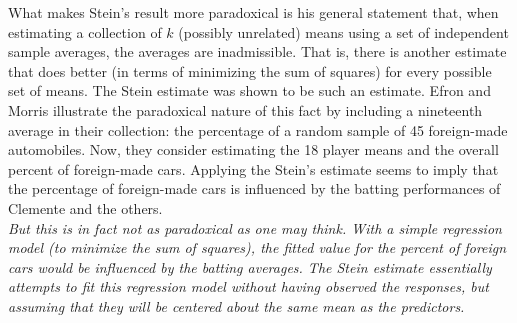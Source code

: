 \begin{enumerate}[a)]
    What makes Stein's result more paradoxical is his general statement that,
when estimating a collection of $k$ (possibly unrelated) means using a set of independent sample averages, the averages
are inadmissible. That is, there is another estimate that does better (in terms of minimizing the sum of squares) for every possible set of means. The Stein estimate
was shown to be such an estimate. Efron and Morris illustrate the paradoxical nature of this fact by including a nineteenth average in their collection: the
percentage of a random sample of 45 foreign-made automobiles. Now, they
consider estimating the 18 player means and the overall percent of foreign-made
cars. Applying the Stein's estimate seems to imply that the percentage of foreign-made cars is influenced by the batting performances of Clemente and
the others. \\

\textit{But this is in fact not as paradoxical as one may think. With a simple regression model (to minimize the sum of squares),
the fitted value for the percent of foreign cars would be influenced by the batting
averages. The Stein estimate essentially attempts to fit this regression model
without having observed the responses, but assuming that they will be centered about the same mean as the predictors.}
\end{enumerate}
